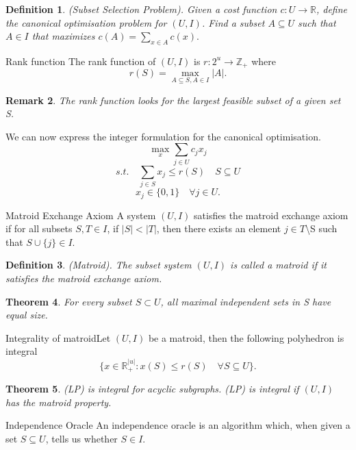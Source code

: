 \documentclass[twoside]{article}
\newcounter{lecnum}
\newtheorem{theorem}{Theorem}[lecnum]
\newtheorem{definition}[theorem]{Definition}
\newtheorem{remark}[theorem]{Remark}
\begin{document}
\begin{definition}(Subset Selection Problem). Given a cost function $c:U \rightarrow \mathbb{R}$, define the canonical optimisation problem for $(U,I)$. Find a subset $A \subseteq U$ such that $A \in I$ that maximizes $c(A) = \sum_{x \in A}c(x).$
\end{definition}

\begin{definition_exam}{Rank function}{} The rank function of $(U,I)$ is $r: 2^u \rightarrow \mathbb{Z}_{+}$ where 
$$
r(S) = \max_{A \subseteq S, A \in I}|A|.
$$
\end{definition_exam}

\begin{remark}The rank function looks for the largest feasible subset of a given set S.
\end{remark}

We can now express the integer formulation for the canonical optimisation.
$$
\max_{x} \sum_{j \in U}c_jx_j
$$
$$
s.t. \quad \sum_{j \in S}x_j \leq r(S) \quad S \subseteq U
$$
$$
x_j \in \{0,1\} \quad \forall j \in U.
$$
\begin{definition_exam}{Matroid Exchange Axiom}{} A system $(U,I)$ satisfies the matroid exchange axiom if for all subsets $S, T \in I$, if $|S| < |T|$, then there exists an element $j \in T $\textbackslash S such that $S \cup \{j\} \in I.$
\end{definition_exam}

\begin{definition}(Matroid). The subset system $(U,I)$ is called a matroid if it satisfies the matroid exchange axiom.
\end{definition}

\begin{theorem}For every subset $S \subset U$, all maximal independent sets in S have equal size.
\end{theorem}


\begin{theorem_exam}{Integrality of matroid}{}Let $(U,I)$ be a matroid, then the following polyhedron is integral 
$$
\{x \in \mathbb{R}_{+}^{|u|}: x(S) \leq r(S) \quad \forall S \subseteq U\}.
$$
\end{theorem_exam}

\begin{theorem}(LP) is integral for acyclic subgraphs. (LP) is integral if $(U,I)$ has the matroid property.
\end{theorem}

\begin{definition_exam}{Independence Oracle}{} An independence oracle is an algorithm which, when given a set $S \subseteq U$, tells us whether $S \in I.$
\end{definition_exam}
\end{document}
